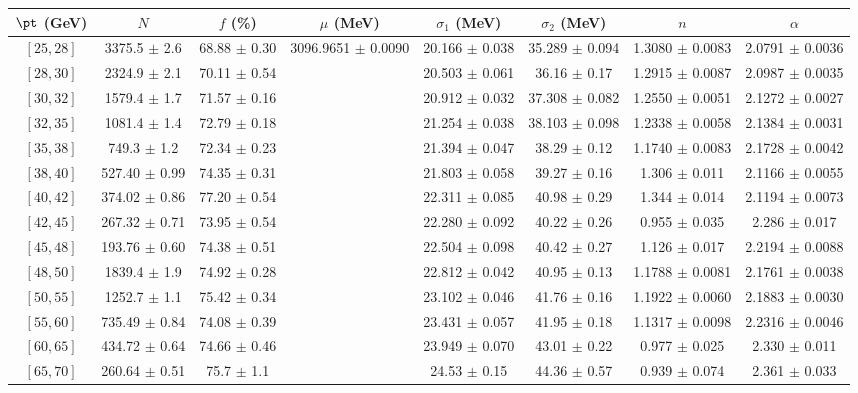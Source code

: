 \begin{tabular}{c||c|c|c|c|c|c|c}
$\pt$ (GeV) & $N$ & $f$ (\%) & $\mu$ (MeV) & $\sigma_1$ (MeV) & $\sigma_2$ (MeV) & $n$ & $\alpha$ \\
\hline
$[25, 28]$ & 3375.5 $\pm$ 2.6 & 68.88 $\pm$ 0.30 & \multirow{19}{*}{3096.9651 $\pm$ 0.0090} & 20.166 $\pm$ 0.038 & 35.289 $\pm$ 0.094 & 1.3080 $\pm$ 0.0083 & 2.0791 $\pm$ 0.0036\\
$[28, 30]$ & 2324.9 $\pm$ 2.1 & 70.11 $\pm$ 0.54 &  & 20.503 $\pm$ 0.061 & 36.16 $\pm$ 0.17 & 1.2915 $\pm$ 0.0087 & 2.0987 $\pm$ 0.0035\\
$[30, 32]$ & 1579.4 $\pm$ 1.7 & 71.57 $\pm$ 0.16 &  & 20.912 $\pm$ 0.032 & 37.308 $\pm$ 0.082 & 1.2550 $\pm$ 0.0051 & 2.1272 $\pm$ 0.0027\\
$[32, 35]$ & 1081.4 $\pm$ 1.4 & 72.79 $\pm$ 0.18 &  & 21.254 $\pm$ 0.038 & 38.103 $\pm$ 0.098 & 1.2338 $\pm$ 0.0058 & 2.1384 $\pm$ 0.0031\\
$[35, 38]$ & 749.3 $\pm$ 1.2 & 72.34 $\pm$ 0.23 &  & 21.394 $\pm$ 0.047 & 38.29 $\pm$ 0.12 & 1.1740 $\pm$ 0.0083 & 2.1728 $\pm$ 0.0042\\
$[38, 40]$ & 527.40 $\pm$ 0.99 & 74.35 $\pm$ 0.31 &  & 21.803 $\pm$ 0.058 & 39.27 $\pm$ 0.16 & 1.306 $\pm$ 0.011 & 2.1166 $\pm$ 0.0055\\
$[40, 42]$ & 374.02 $\pm$ 0.86 & 77.20 $\pm$ 0.54 &  & 22.311 $\pm$ 0.085 & 40.98 $\pm$ 0.29 & 1.344 $\pm$ 0.014 & 2.1194 $\pm$ 0.0073\\
$[42, 45]$ & 267.32 $\pm$ 0.71 & 73.95 $\pm$ 0.54 &  & 22.280 $\pm$ 0.092 & 40.22 $\pm$ 0.26 & 0.955 $\pm$ 0.035 & 2.286 $\pm$ 0.017\\
$[45, 48]$ & 193.76 $\pm$ 0.60 & 74.38 $\pm$ 0.51 &  & 22.504 $\pm$ 0.098 & 40.42 $\pm$ 0.27 & 1.126 $\pm$ 0.017 & 2.2194 $\pm$ 0.0088\\
$[48, 50]$ & 1839.4 $\pm$ 1.9 & 74.92 $\pm$ 0.28 &  & 22.812 $\pm$ 0.042 & 40.95 $\pm$ 0.13 & 1.1788 $\pm$ 0.0081 & 2.1761 $\pm$ 0.0038\\
$[50, 55]$ & 1252.7 $\pm$ 1.1 & 75.42 $\pm$ 0.34 &  & 23.102 $\pm$ 0.046 & 41.76 $\pm$ 0.16 & 1.1922 $\pm$ 0.0060 & 2.1883 $\pm$ 0.0030\\
$[55, 60]$ & 735.49 $\pm$ 0.84 & 74.08 $\pm$ 0.39 &  & 23.431 $\pm$ 0.057 & 41.95 $\pm$ 0.18 & 1.1317 $\pm$ 0.0098 & 2.2316 $\pm$ 0.0046\\
$[60, 65]$ & 434.72 $\pm$ 0.64 & 74.66 $\pm$ 0.46 &  & 23.949 $\pm$ 0.070 & 43.01 $\pm$ 0.22 & 0.977 $\pm$ 0.025 & 2.330 $\pm$ 0.011\\
$[65, 70]$ & 260.64 $\pm$ 0.51 & 75.7 $\pm$ 1.1 &  & 24.53 $\pm$ 0.15 & 44.36 $\pm$ 0.57 & 0.939 $\pm$ 0.074 & 2.361 $\pm$ 0.033\\

\end{tabular}
